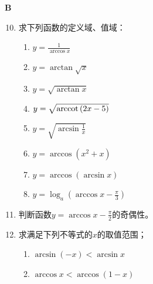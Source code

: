 \begin{center}
    \bfseries B
\end{center}

\begin{enumerate}\setcounter{enumi}{9}
    \item 求下列函数的定义域、值域：
\begin{multicols}{2}
\begin{enumerate}[(1)]
    \item $y=\frac{1}{\arccos x}$
    \item $y=\arctan\sqrt{x}$
    \item $y=\sqrt{\arctan x}$
    \item $y=\sqrt{{\rm arccot\,}(2x-5)}$
    \item $y=\sqrt{\arcsin\frac{1}{x}}$
    \item $y=\arccos(x^2+x)$
    \item $y=\arccos(\arcsin x)$
    \item $y=\log_a\left(\arccos x-\frac{\pi}{3}\right)$
\end{enumerate}
\end{multicols}


\item 判断函数$y=\arccos x-\frac{\pi}{2}$的奇偶性。
\item 求满足下列不等式的$x$的取值范围；
\begin{multicols}{2}
\begin{enumerate}[(1)]
    \item $\arcsin (-x)<\arcsin x$
    \item $\arccos x<\arccos (1-x)$
\end{enumerate}
\end{multicols}

\end{enumerate}


